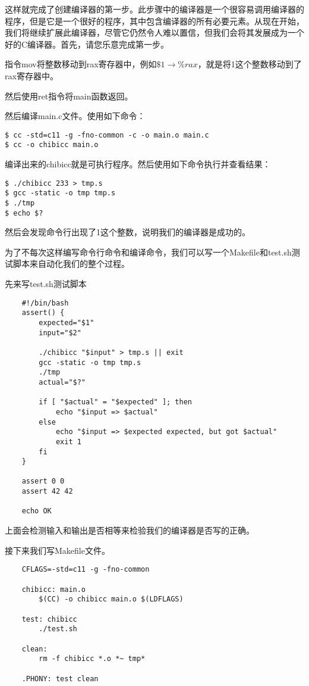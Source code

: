 \documentclass[cn,10pt,math=newtx,citestyle=gb7714-2015,bibstyle=gb7714-2015]{elegantbook}
\begin{document}
这样就完成了创建编译器的第一步。此步骤中的编译器是一个很容易调用编译器的程序，但是它是一个很好的程序，其中包含编译器的所有必要元素。从现在开始，我们将继续扩展此编译器，尽管它仍然令人难以置信，但我们会将其发展成为一个好的C编译器。首先，请您乐意完成第一步。

指令mov将整数移动到rax寄存器中，例如$\$1 \rightarrow \%rax$，就是将1这个整数移动到了rax寄存器中。

然后使用ret指令将main函数返回。

然后编译main.c文件。使用如下命令：

\begin{verbatim}
$ cc -std=c11 -g -fno-common -c -o main.o main.c
$ cc -o chibicc main.o
\end{verbatim}

编译出来的chibicc就是可执行程序。然后使用如下命令执行并查看结果：

\begin{verbatim}
$ ./chibicc 233 > tmp.s
$ gcc -static -o tmp tmp.s
$ ./tmp
$ echo $?
\end{verbatim}

然后会发现命令行出现了1这个整数，说明我们的编译器是成功的。

为了不每次这样编写命令行命令和编译命令，我们可以写一个Makefile和test.sh测试脚本来自动化我们的整个过程。

先来写test.sh测试脚本

\begin{verbatim}
    #!/bin/bash
    assert() {
        expected="$1"
        input="$2"

        ./chibicc "$input" > tmp.s || exit
        gcc -static -o tmp tmp.s
        ./tmp
        actual="$?"

        if [ "$actual" = "$expected" ]; then
            echo "$input => $actual"
        else
            echo "$input => $expected expected, but got $actual"
            exit 1
        fi
    }

    assert 0 0
    assert 42 42

    echo OK
\end{verbatim}

上面会检测输入和输出是否相等来检验我们的编译器是否写的正确。

接下来我们写Makefile文件。

\begin{verbatim}
    CFLAGS=-std=c11 -g -fno-common

    chibicc: main.o
        $(CC) -o chibicc main.o $(LDFLAGS)

    test: chibicc
        ./test.sh

    clean:
        rm -f chibicc *.o *~ tmp*

    .PHONY: test clean
\end{verbatim}
\end{document}
